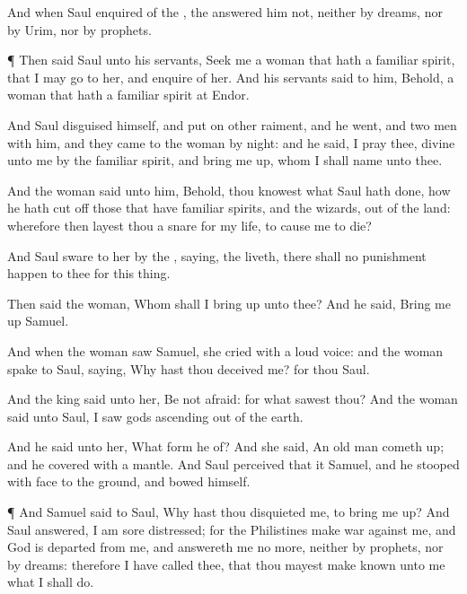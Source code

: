 {And when
Saul
enquired of the
{}, the
{}
answered him not, neither by
dreams, nor by
Urim, nor by
prophets.


\par }{\PP {}¶ Then
said
Saul unto his
servants,
Seek me a
woman that
hath a familiar
spirit, that I may
go to her, and
enquire of her. And his
servants
said to him, Behold,
{} a
woman that
hath a familiar
spirit at
Endor.

And
Saul
disguised himself, and put
on
other
raiment, and he
went, and
two
men with him, and they
came to the
woman by
night: and he
said, I pray thee,
divine unto me by the familiar
spirit, and bring me
{}
up, whom I shall
name unto thee.

And the
woman
said unto him, Behold, thou
knowest what
Saul hath
done, how he hath cut
off those that have familiar
spirits, and the
wizards, out of the
land: wherefore then layest thou a
snare for my
life, to cause me to
die?

And
Saul
sware to her by the
{},
saying,
{} the
{}
liveth, there
shall no
punishment
happen to thee for this
thing.

Then
said the
woman, Whom shall I bring
up unto thee? And he
said, Bring me
up
Samuel.

And when the
woman
saw
Samuel, she
cried with a
loud
voice: and the
woman
spake to
Saul,
saying, Why hast thou
deceived me? for thou
{}
Saul.

And the
king
said unto her, Be not
afraid: for what
sawest thou? And the
woman
said unto
Saul, I
saw
gods
ascending out of the
earth.

And he
said unto her, What
form
{} he of? And she
said, An
old
man cometh
up; and he
{}
covered with a
mantle. And
Saul
perceived that it
{}
Samuel, and he
stooped with
{}
face to the
ground, and
bowed himself.


\par }{\PP {}¶ And
Samuel
said to
Saul, Why hast thou
disquieted me, to bring me
up? And
Saul
answered, I am
sore
distressed; for the
Philistines make
war against me, and
God is
departed from me, and
answereth me no more, neither
by
prophets, nor by
dreams: therefore I have
called thee, that thou mayest make
known unto me what I shall
do.

}
